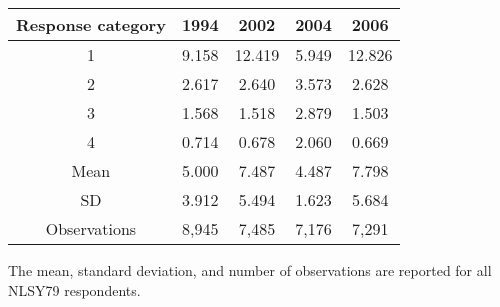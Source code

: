 {
	\begin{threeparttable}
		\begin{tabular}{c c c c c}
			\toprule
			Response category & 1994 & 2002 & 2004 & 2006 \\
			\midrule
			1 & 9.158 & 12.419 & 5.949 & 12.826 \\
			2 & 2.617 & 2.640 & 3.573 & 2.628 \\
			3 & 1.568 & 1.518 & 2.879 & 1.503 \\
			4 & 0.714 & 0.678 & 2.060 &  0.669 \\
			\midrule
			Mean & 5.000 & 7.487 & 4.487 & 7.798 \\
			SD & 3.912 & 5.494 & 1.623 & 5.684 \\
			Observations & 8,945 & 7,485 & 7,176 & 7,291 \\
			\bottomrule
		\end{tabular}
		\begin{tablenotes}[flushleft]
			\item The mean, standard deviation, and number of observations are reported for all NLSY79 respondents.
		\end{tablenotes}
	\end{threeparttable}
	
}